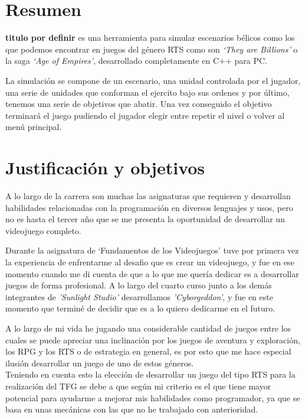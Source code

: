 \chapter*{Resumen}
\label{Resumen}
\textbf{titulo por definir} es una herramienta para simular escenarios 
bélicos como los que podemos encontrar en juegos del género \ac{RTS} como son
\textit{`They are Billions'} o la saga \textit{`Age of Empires'}, desarrollado
completamente en C++ para \ac{PC}.

La simulación se compone de un escenario, una unidad controlada por el jugador,
una serie de unidades que conforman el ejercito bajo sus ordenes y por último, 
tenemos una serie de objetivos que abatir. Una vez conseguido el objetivo terminará
el juego pudiendo el jugador elegir entre repetir el nivel o volver al menú principal.

\chapter*{Justificación y objetivos}
A lo largo de la carrera son muchas las asignaturas que requieren y desarrollan
habilidades relacionadas con la programación en diversos lenguajes y usos, 
pero no es hasta el tercer año que se me presenta la oportunidad de desarrollar
un videojuego completo. 

Durante la asignatura de `Fundamentos de los Videojuegos' tuve por primera vez
la experiencia de enfrentarme al desafio que es crear un videojuego, y fue en ese
momento cuando me di cuenta de que a lo que me quería dedicar es a
desarrollar juegos de forma profesional. A lo largo del cuarto curso junto a los demás
integrantes de \textit{'Sunlight Studio'} desarrollamos \textit{'Cyborgeddon'}, y fue
en este momento que terminé de decidir que es a lo quiero dedicarme en el futuro.

A lo largo de mi vida he jugando una considerable cantidad de juegos entre los cuales
se puede apreciar una inclinación por los juegos de aventura y exploración, los 
\ac{RPG} y los \ac{RTS} o de estrategia en general, es por esto que me hace especial
ilusión desarrollar un juego de uno de estos géneros.\\
Teniendo en cuenta esto la elección de desarrollar un juego del tipo \ac{RTS} para la
realización del \ac{TFG} se debe a que según mi criterio es el que tiene mayor
potencial para ayudarme a mejorar mis habilidades como programador, ya que se basa en
unas mecánicas con las que no he trabajado con anterioridad.

